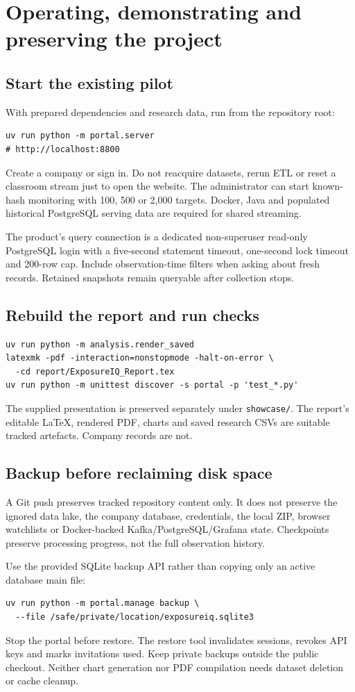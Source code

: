 \documentclass[11pt,a4paper]{article}
\newcommand{\code}[1]{{\small\nolinkurl{#1}}}
\newcommand{\chapterpage}[1]{\clearpage\section{#1}}
\begin{document}
\chapterpage{Operating, demonstrating and preserving the project}
\subsection{Start the existing pilot}
With prepared dependencies and research data, run from the repository root:
\begin{verbatim}
uv run python -m portal.server
# http://localhost:8800
\end{verbatim}
Create a company or sign in. Do not reacquire datasets, rerun ETL or reset a
classroom stream just to open the website. The administrator can start
known-hash monitoring with 100, 500 or 2,000 targets. Docker, Java and
populated historical PostgreSQL serving data are required for shared streaming.

The product's query connection is a dedicated non-superuser read-only
PostgreSQL login with a five-second statement timeout, one-second lock
timeout and 200-row cap. Include observation-time filters when asking about
fresh records. Retained snapshots remain queryable after collection stops.

\subsection{Rebuild the report and run checks}
\begin{verbatim}
uv run python -m analysis.render_saved
latexmk -pdf -interaction=nonstopmode -halt-on-error \
  -cd report/ExposureIQ_Report.tex
uv run python -m unittest discover -s portal -p 'test_*.py'
\end{verbatim}
The supplied presentation is preserved separately under \code{showcase/}.
The report's editable LaTeX, rendered PDF, charts and saved research CSVs
are suitable tracked artefacts. Company records are not.

\subsection{Backup before reclaiming disk space}
A Git push preserves tracked repository content only. It does not preserve
the ignored data lake, the company database, credentials, the local ZIP,
browser watchlists or Docker-backed Kafka/PostgreSQL/Grafana state.
Checkpoints preserve processing progress, not the full observation history.

Use the provided SQLite backup API rather than copying only an active
database main file:
\begin{verbatim}
uv run python -m portal.manage backup \
  --file /safe/private/location/exposureiq.sqlite3
\end{verbatim}
Stop the portal before restore. The restore tool invalidates sessions,
revokes API keys and marks invitations used. Keep private backups outside
the public checkout. Neither chart generation nor PDF compilation needs
dataset deletion or cache cleanup.
\end{document}
